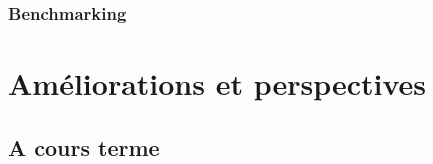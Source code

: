 \documentclass[10pt]{report}
\begin{document}
%		


	\subsection{Benchmarking}
	
\chapter{Améliorations et perspectives}
	\section{A cours terme}
\end{document}
